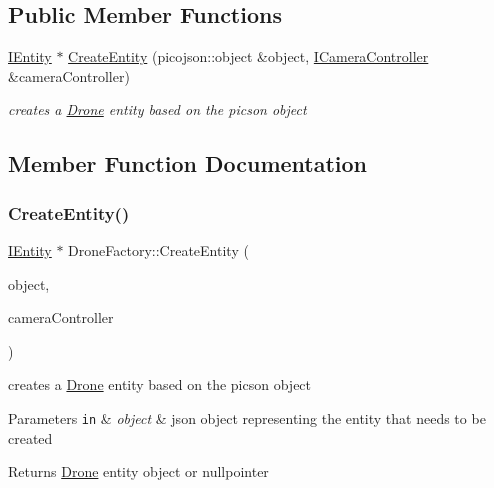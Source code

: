 \subsection*{Public Member Functions}
\begin{DoxyCompactItemize}
\item 
\hyperlink{classIEntity}{I\+Entity} $\ast$ \hyperlink{classDroneFactory_a058b7be67ed594854ab9605236fa5c7e}{Create\+Entity} (picojson\+::object \&object, \hyperlink{classICameraController}{I\+Camera\+Controller} \&camera\+Controller)
\begin{DoxyCompactList}\small\item\em creates a \hyperlink{classDrone}{Drone} entity based on the picson object \end{DoxyCompactList}\end{DoxyCompactItemize}


\subsection{Member Function Documentation}
\mbox{\label{classDroneFactory_a058b7be67ed594854ab9605236fa5c7e}} 
\subsubsection{\texorpdfstring{Create\+Entity()}{CreateEntity()}}
{\footnotesize\ttfamily \hyperlink{classIEntity}{I\+Entity} $\ast$ Drone\+Factory\+::\+Create\+Entity (\begin{DoxyParamCaption}\item[{picojson\+::object \&}]{object,  }\item[{\hyperlink{classICameraController}{I\+Camera\+Controller} \&}]{camera\+Controller }\end{DoxyParamCaption})\hspace{0.3cm}{\ttfamily [virtual]}}



creates a \hyperlink{classDrone}{Drone} entity based on the picson object 


\begin{DoxyParams}[1]{Parameters}
\mbox{\tt in}  & {\em object} & json object representing the entity that needs to be created\\
\hline
\end{DoxyParams}
\begin{DoxyReturn}{Returns}
\hyperlink{classDrone}{Drone} entity object or nullpointer 
\end{DoxyReturn}


